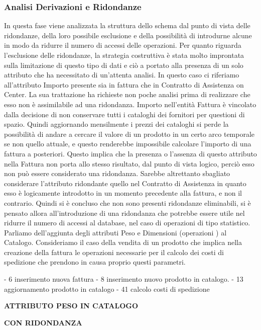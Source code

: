 
\subsubsection{Analisi Derivazioni e Ridondanze}
In questa fase viene analizzata la struttura dello schema dal punto di vista delle ridondanze, della loro possibile esclusione e della possibilità di introdurne alcune in modo da ridurre il numero di accessi delle operazioni. \newline 
Per quanto riguarda l'esclusione delle ridondanze, la strategia costruttiva è stata molto improntata sulla limitazione di questo tipo di dati e ciò a portato alla presenza di un solo attributo che ha necessitato di un'attenta analisi. In questo caso ci riferiamo all'attributo Importo presente sia in fattura che in Contratto di Assistenza on Center. La sua trattazione ha richieste non poche analisi prima di realizzare che esso non è assimilabile ad una ridondanza. Importo nell'entità Fattura è vincolato dalla decisione di non conservare tutti i cataloghi dei fornitori per questioni di spazio. Quindi aggiornando mensilmente i prezzi dei cataloghi si perde la possibilità di andare a cercare il valore di un prodotto in un certo arco temporale se non quello attuale, e questo renderebbe impossibile calcolare l'importo di una fattura a posteriori.\newline
Questo implica che la presenza o l'assenza di questo attributo nella Fattura non porta allo stesso risultato, dal punto di vista logico, perciò esso non può essere considerato una ridondanza. Sarebbe altrettanto sbagliato considerare l'attributo ridondante quello nel Contratto di Assistenza in quanto esso è logicamente introdotto in un momento precedente alla fattura, e non il contrario.\newline
Quindi si è concluso che non sono presenti ridondanze eliminabili, si è pensato allora all'introduzione di una ridondanza che potrebbe essere utile nel ridurre il numero di accessi al database, nel caso di operazioni di tipo statistico. Parliamo dell'aggiunta degli attributi Peso e Dimensioni (operazioni ) al Catalogo.
Consideriamo il caso della vendita di un prodotto che implica nella creazione della fattura le operazioni necessarie per il calcolo dei costi di spedizione che prendono in causa proprio questi parametri.

- 6 inserimento nuova fattura
- 8 inserimento nuovo prodotto in catalogo.
- 13 aggiornamento prodotto in catalogo
- 41 calcolo costi di spedizione


\newline\newline
\centerline{\textbf{ATTRIBUTO PESO IN CATALOGO}}
\newline\newline
\centerline{\textbf{CON RIDONDANZA}}


